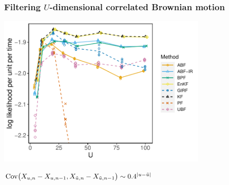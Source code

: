\documentclass{beamer}
\begin{document}
    


\begin{frame}
\frametitle{Filtering $U$-dimensional correlated Brownian motion}

\vspace{-3mm}

\begin{center}
\includegraphics[width=10cm]{bm_alt_plot-1.pdf}

\vspace{-1mm}

$\mathrm{Cov}\big(X_{u,n}-X_{u,n-1},X_{\tilde u,n}-X_{\tilde u,n-1}\big) \sim 0.4^{|u-\tilde u|}_{}$

\end{center}

\end{frame}
\end{document}
